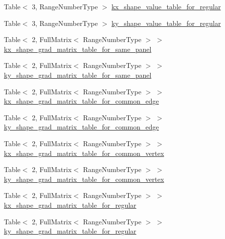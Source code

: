 \begin{DoxyCompactItemize}
Table$<$ 3, Range\+Number\+Type $>$ \hyperlink{classLaplaceBEM_1_1BEMValues_a8bc399c98420015f7f7f50185da924e1}{kx\+\_\+shape\+\_\+value\+\_\+table\+\_\+for\+\_\+regular}
\item 
Table$<$ 3, Range\+Number\+Type $>$ \hyperlink{classLaplaceBEM_1_1BEMValues_ac627ae572f0006b87b0b3a48d9fefb12}{ky\+\_\+shape\+\_\+value\+\_\+table\+\_\+for\+\_\+regular}
\item 
Table$<$ 2, Full\+Matrix$<$ Range\+Number\+Type $>$ $>$ \hyperlink{classLaplaceBEM_1_1BEMValues_a19d5b2247953a84c2974e2f2ff118810}{kx\+\_\+shape\+\_\+grad\+\_\+matrix\+\_\+table\+\_\+for\+\_\+same\+\_\+panel}
\item 
Table$<$ 2, Full\+Matrix$<$ Range\+Number\+Type $>$ $>$ \hyperlink{classLaplaceBEM_1_1BEMValues_ab42688bec1d85d6f09f45d419839278f}{ky\+\_\+shape\+\_\+grad\+\_\+matrix\+\_\+table\+\_\+for\+\_\+same\+\_\+panel}
\item 
Table$<$ 2, Full\+Matrix$<$ Range\+Number\+Type $>$ $>$ \hyperlink{classLaplaceBEM_1_1BEMValues_af4356394bc832b8a4ff732885916384b}{kx\+\_\+shape\+\_\+grad\+\_\+matrix\+\_\+table\+\_\+for\+\_\+common\+\_\+edge}
\item 
Table$<$ 2, Full\+Matrix$<$ Range\+Number\+Type $>$ $>$ \hyperlink{classLaplaceBEM_1_1BEMValues_a8b8a0368ac2b1b7c2ac17a2a4b95f997}{ky\+\_\+shape\+\_\+grad\+\_\+matrix\+\_\+table\+\_\+for\+\_\+common\+\_\+edge}
\item 
Table$<$ 2, Full\+Matrix$<$ Range\+Number\+Type $>$ $>$ \hyperlink{classLaplaceBEM_1_1BEMValues_ab899ed26e3876de83d8fe09d8579b1ee}{kx\+\_\+shape\+\_\+grad\+\_\+matrix\+\_\+table\+\_\+for\+\_\+common\+\_\+vertex}
\item 
Table$<$ 2, Full\+Matrix$<$ Range\+Number\+Type $>$ $>$ \hyperlink{classLaplaceBEM_1_1BEMValues_ac9cf75ccfd80b75decfa4e36d4de3f73}{ky\+\_\+shape\+\_\+grad\+\_\+matrix\+\_\+table\+\_\+for\+\_\+common\+\_\+vertex}
\item 
Table$<$ 2, Full\+Matrix$<$ Range\+Number\+Type $>$ $>$ \hyperlink{classLaplaceBEM_1_1BEMValues_ab8c54d091a90e46854f782cb390fd176}{kx\+\_\+shape\+\_\+grad\+\_\+matrix\+\_\+table\+\_\+for\+\_\+regular}
\item 
Table$<$ 2, Full\+Matrix$<$ Range\+Number\+Type $>$ $>$ \hyperlink{classLaplaceBEM_1_1BEMValues_a83e4f5a68a6f8f7c522ca3e441d0e681}{ky\+\_\+shape\+\_\+grad\+\_\+matrix\+\_\+table\+\_\+for\+\_\+regular}
\end{DoxyCompactItemize}
